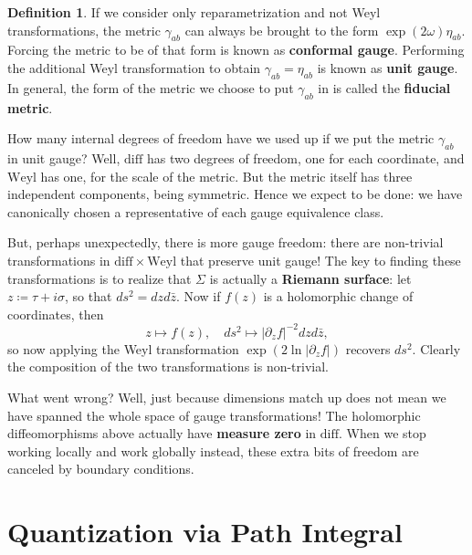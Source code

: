 \documentclass{report}
\theoremstyle{plain}
\theoremstyle{definition}
\newtheorem{definition}[theorem]{Definition}
\theoremstyle{remark}
\newcommand{\di}{\partial}
\newcommand{\diff}{\mathrm{diff}}
\newcommand{\Weyl}{\mathrm{Weyl}}
\begin{document}
\begin{definition}
  If we consider only reparametrization and not Weyl transformations,
  the metric $\gamma_{ab}$ can always be brought to the form
  $\exp(2\omega)\eta_{ab}$. Forcing the metric to be of that form is
  known as {\bf conformal gauge}. Performing the additional Weyl
  transformation to obtain $\gamma_{ab} = \eta_{ab}$ is known as {\bf
    unit gauge}. In general, the form of the metric we choose to put
  $\gamma_{ab}$ in is called the {\bf fiducial metric}.
\end{definition}

How many internal degrees of freedom have we used up if we put the
metric $\gamma_{ab}$ in unit gauge? Well, $\diff$ has two degrees of
freedom, one for each coordinate, and $\Weyl$ has one, for the scale
of the metric. But the metric itself has three independent components,
being symmetric. Hence we expect to be done: we have canonically
chosen a representative of each gauge equivalence class.

But, perhaps unexpectedly, there is more gauge freedom: there are
non-trivial transformations in $\diff \times \Weyl$ that preserve unit
gauge! The key to finding these transformations is to realize that
$\Sigma$ is actually a {\bf Riemann surface}: let $z \coloneqq \tau +
i\sigma$, so that $ds^2 = dz d\bar{z}$. Now if $f(z)$ is a holomorphic
change of coordinates, then
\[ z \mapsto f(z), \quad ds^2 \mapsto |\di_z f|^{-2} dz d\bar{z}, \]
so now applying the Weyl transformation $\exp(2 \ln |\di_z f|)$
recovers $ds^2$. Clearly the composition of the two transformations is
non-trivial.

What went wrong? Well, just because dimensions match up does not mean
we have spanned the whole space of gauge transformations! The
holomorphic diffeomorphisms above actually have {\bf measure zero} in
$\diff$. When we stop working locally and work globally instead, these
extra bits of freedom are canceled by boundary conditions.

\section{Quantization via Path Integral}
\end{document}
